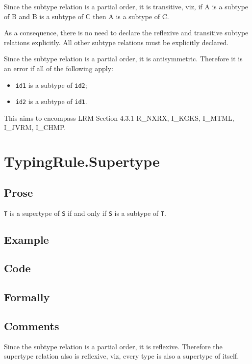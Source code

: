 \documentclass{book}
\begin{document}
  Since the subtype relation is a partial order, it is transitive, viz, if A is
  a subtype of B and B is a subtype of C then A is a subtype of C.
 
  As a consequence, there is no need to declare the reflexive and transitive
  subtype relations explicitly. All other subtype relations must be explicitly
  declared.
 
  Since the subtype relation is a partial order, it is antisymmetric. Therefore
  it is an error if all of the following apply:
  \begin{itemize}
  \item \texttt{id1} is a subtype of \texttt{id2};
  \item \texttt{id2} is a subtype of \texttt{id1}.
  \end{itemize}

  This aims to encompass LRM Section 4.3.1 R\_NXRX, I\_KGKS, I\_MTML, I\_JVRM, I\_CHMP.

\section{TypingRule.Supertype}

  \subsection{Prose}
  \texttt{T} is a supertype of \texttt{S} if and only if \texttt{S} is a subtype of \texttt{T}.

  \subsection{Example}

  \subsection{Code}

\begin{emptyformal}
  \subsection{Formally}
\end{emptyformal}

\subsection{Comments}
  Since the subtype relation is a partial order, it is reflexive. Therefore the
  supertype relation also is reflexive, viz, every type is also a supertype of
  itself.
\end{document}
